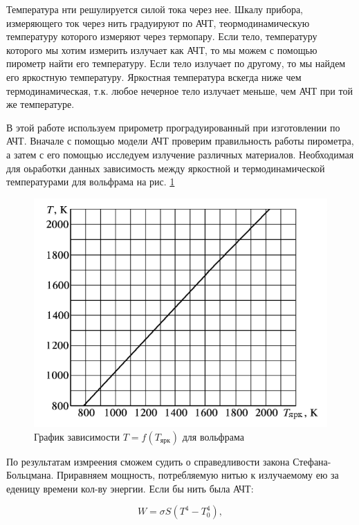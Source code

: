 \documentclass[a4paper]{article}
\begin{document}
Температура нти решулируется силой тока через нее. Шкалу прибора, измеряющего ток через нить градуируют
по АЧТ, теормодинамическую температуру которого измеряют через термопару. Если тело, температуру которого
мы хотим измерить излучает как АЧТ, то мы можем с помощью пирометр найти его температуру. Если тело излучает по другому,
то мы найдем его яркостную температуру. Яркостная температура вскегда ниже чем термодинамическая, т.к. 
любое нечерное тело излучает меньше, чем АЧТ при той же температуре. \par 

В этой работе используем прирометр проградуированный при изготовлении по АЧТ. Вначале с помощью модели АЧТ 
проверим правильность работы пирометра, а затем с его помощью исследуем излучение различных материалов. Необходимая для оьработки 
данных зависимость между яркостной и термодинамической температурами для вольфрама на рис. \ref{p1}

\begin{figure}[H]
    \begin{center}
    \includegraphics[scale = 0.8]{p1.png}
    \caption{График зависимости $T = f(T_{\text{ярк}})$ для вольфрама}
    \label{p1}
    \end{center}
\end{figure}

По результатам измреения сможем судить о справедливости закона Стефана-Больцмана. Приравняем мощность, 
потребляемую нитью к излучаемому ею за еденицу времени кол-ву энергии. Если бы нить была АЧТ:

\begin{equation}
    W = \sigma S (T^4 - T_0^4),
\end{equation}
\end{document}
